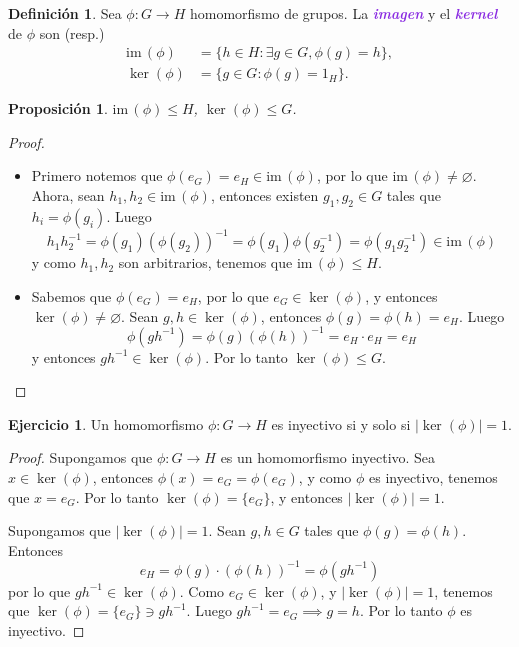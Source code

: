 \documentclass{article}
\newtheorem{proposition}[theorem]{Proposición}
\theoremstyle{definition}
\newtheorem{definition}[theorem]{Definición}
\newtheorem{exercise}{Ejercicio}
\theoremstyle{remark}
\numberwithin{equation}{section}
\renewcommand{\c}{\cdot}
\newcommand{\im}{\mathrm{im}\,}
\newcommand{\abs}[1]{\left| #1 \right|}
\newcommand{\wea}[1]{\textcolor{BlueViolet}{\textbf{\emph{#1}}}}
\begin{document}
\begin{definition}
  Sea $\phi \colon G \to H$ homomorfismo de grupos. La \wea{imagen} y el \wea{kernel} de $\phi$ son (resp.)
  \begin{align*}
    \im(\phi) &= \{h \in H : \exists g \in G, \phi(g) = h\}, \\
    \ker(\phi) &= \{g \in G : \phi(g) = 1_H\}.
  \end{align*}
\end{definition}

\begin{proposition}
  $\im(\phi) \leqslant H$, $\ker(\phi) \leqslant G$.
\end{proposition}
\begin{proof}
  \
  \begin{itemize}
    \item \boxed{\im\phi} Primero notemos que $\phi(e_G) = e_H \in \im(\phi)$, por lo que $\im(\phi) \neq \varnothing$. Ahora, sean $h_1,h_2 \in \im(\phi)$, entonces existen $g_1,g_2 \in G$ tales que $h_i = \phi(g_i)$. Luego $$h_1 h_2^{-1} = \phi(g_1) (\phi(g_2))^{-1} = \phi(g_1) \phi(g_2^{-1}) = \phi(g_1 g_2^{-1}) \in \im(\phi)$$ y como $h_1,h_2$ son arbitrarios, tenemos que $\im(\phi) \leqslant H$.
    \item \boxed{\ker(\phi)} Sabemos que $\phi(e_G) = e_H$, por lo que $e_G \in \ker(\phi)$, y entonces $\ker(\phi) \neq \varnothing$. Sean $g,h \in \ker(\phi)$, entonces $\phi(g) = \phi(h) = e_H$. Luego $$\phi(gh^{-1}) = \phi(g) (\phi(h))^{-1} = e_H \c e_H = e_H$$ y entonces $gh^{-1} \in \ker(\phi)$. Por lo tanto $\ker(\phi) \leqslant G$.
  \end{itemize}
\end{proof}

\begin{exercise}
  Un homomorfismo $\phi \colon G \to H$ es inyectivo si y solo si $\abs{\ker(\phi)} = 1$.
\end{exercise}
\begin{proof}
  \boxed{\implies}
  Supongamos que $\phi \colon G \to H$ es un homomorfismo inyectivo. Sea $x \in \ker(\phi)$, entonces $\phi(x) = e_G = \phi(e_G)$, y como $\phi$ es inyectivo, tenemos que $x = e_G$. Por lo tanto $\ker(\phi) = \{e_G\}$, y entonces $\abs{\ker(\phi)} = 1$.

  \boxed{\impliedby}
  Supongamos que $\abs{\ker(\phi)} = 1$. Sean $g,h \in G$ tales que $\phi(g) = \phi(h)$. Entonces
  $$e_H = \phi(g) \c (\phi(h))^{-1} = \phi(gh^{-1})$$
  por lo que $gh^{-1} \in \ker(\phi)$. Como $e_G \in \ker(\phi)$, y $|\ker(\phi)| = 1$, tenemos que $\ker(\phi) = \{e_G\} \ni gh^{-1}$. Luego $gh^{-1} = e_G \implies g=h$. Por lo tanto $\phi$ es inyectivo.
\end{proof}
\end{document}

